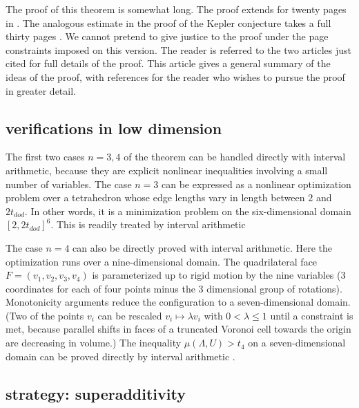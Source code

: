 The proof of this theorem is somewhat long.  The proof extends for 
twenty pages in  \cite[pp.19-38]{arx}.  The analogous estimate in
the proof of the Kepler conjecture takes a full thirty pages 
\cite[pp.126-156]{DCG}.
We cannot pretend to give justice to the proof under the page constraints
imposed on this version.  The reader is referred to the
two articles just cited for full details of the proof.  This article
 gives a general summary of the ideas of the proof, with 
references for the reader who wishes to pursue the proof in greater detail.

\subsection{verifications in low dimension}

The first two cases $n=3,4$ of the theorem can be handled directly with
interval arithmetic, because they are explicit nonlinear 
inequalities involving a small number of variables.  The case $n=3$ can
be expressed as a nonlinear optimization problem over a tetrahedron
whose edge lengths vary in length between $2$ and $2t_{dod}$.  In other
words, it is a minimization problem on the six-dimensional 
domain $[2,2t_{dod}]^6$. This is readily treated by interval arithmetic \cite[exact ref~XX]{code}

The case $n=4$ can also be directly proved with interval arithmetic.  
Here the optimization runs over a nine-dimensional domain.  The
quadrilateral face $F=(v_1,v_2,v_3,v_4)$ is parameterized up to rigid
motion by the nine variables (3 coordinates for each of four points
minus the 3 dimensional group of rotations).  Monotonicity arguments
reduce the configuration to a seven-dimensional domain.  (Two of the
points $v_i$ can be rescaled $v_i \mapsto \lambda v_i$ with $0 < \lambda \le 1$ until a constraint is met, 
because parallel shifts in faces of a truncated Voronoi cell towards the origin are decreasing in volume.)  The inequality $\mu(\Lambda,U)> t_4$ on
a seven-dimensional domain can be proved directly by interval arithmetic \cite[exact ref~XX]{code}.

\subsection{strategy: superadditivity}

